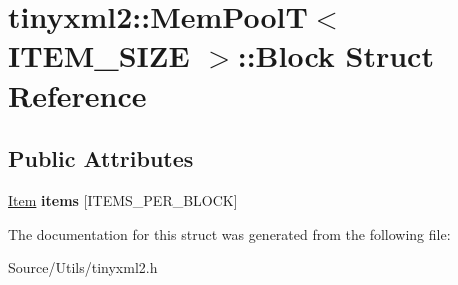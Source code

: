 \hypertarget{structtinyxml2_1_1_mem_pool_t_1_1_block}{}\section{tinyxml2\+:\+:Mem\+PoolT$<$ I\+T\+E\+M\+\_\+\+S\+I\+ZE $>$\+:\+:Block Struct Reference}
\label{structtinyxml2_1_1_mem_pool_t_1_1_block}
\subsection*{Public Attributes}
\begin{DoxyCompactItemize}
\item 
\mbox{\label{structtinyxml2_1_1_mem_pool_t_1_1_block_a4f2589e877b60f26313e107433e550f7}} 
\mbox{\hyperlink{uniontinyxml2_1_1_mem_pool_t_1_1_item}{Item}} {\bfseries items} \mbox{[}I\+T\+E\+M\+S\+\_\+\+P\+E\+R\+\_\+\+B\+L\+O\+CK\mbox{]}
\end{DoxyCompactItemize}


The documentation for this struct was generated from the following file\+:\begin{DoxyCompactItemize}
\item 
Source/\+Utils/tinyxml2.\+h\end{DoxyCompactItemize}
